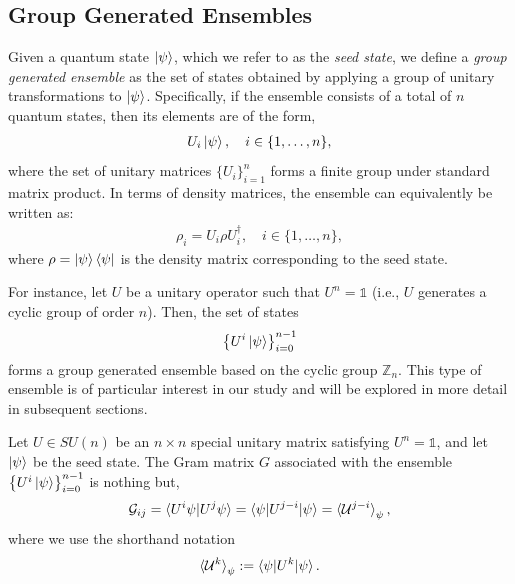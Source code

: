 \documentclass[12pt,letterpaper]{article}
\begin{document}
\begin{multicols}{2}
\section{Group Generated Ensembles}

Given a quantum state $\ket{\psi}$, which we refer to as the \emph{seed state}, we define a \emph{group generated ensemble} as the set of states obtained by applying a group of unitary transformations to $\ket{\psi}$. Specifically, if the ensemble consists of a total of $n$ quantum states, then its elements are of the form,
\begin{align*}
	U_i\ket{\psi}, \quad i \in \{1, \dots, n\},
\end{align*}
where the set of unitary matrices $\{U_i\}_{i=1}^n$ forms a finite group under standard matrix product. In terms of density matrices, the ensemble can equivalently be written as:
\begin{align*}
	\rho_i = U_i \rho U_i^\dagger, \quad i \in \{1, \dots, n\},
\end{align*}
where $\rho = \ket{\psi}\bra{\psi}$ is the density matrix corresponding to the seed state.

For instance, let $U$ be a unitary operator such that $U^n = \mathds{1}$ (i.e., $U$ generates a cyclic group of order $n$). Then, the set of states
\begin{align*}
	\left\{ U^i\ket{\psi} \right\}_{i=0}^{n-1}
\end{align*}
forms a group generated ensemble based on the cyclic group $\mathbb{Z}_n$. This type of ensemble is of particular interest in our study and will be explored in more detail in subsequent sections.

Let $U \in SU(n)$ be an $n \times n$ special unitary matrix satisfying $U^n = \mathds{1}$, and let $\ket{\psi}$ be the seed state. The Gram matrix $G$ associated with the ensemble $\left\{U^i\ket{\psi}\right\}_{i=0}^{n-1}$ is nothing but,
\begin{align*}
	\mathcal{G}_{ij} = \braket{U^i\psi | U^j\psi} = \braket{\psi | U^{j-i} | \psi} = \braket{\mathcal{U}^{j-i}}_{\psi},
\end{align*}
where we use the shorthand notation
\begin{align*}
\braket{\mathcal{U}^k}_\psi := \braket{\psi | U^k | \psi}.
\end{align*}


\end{multicols}
\end{document}
